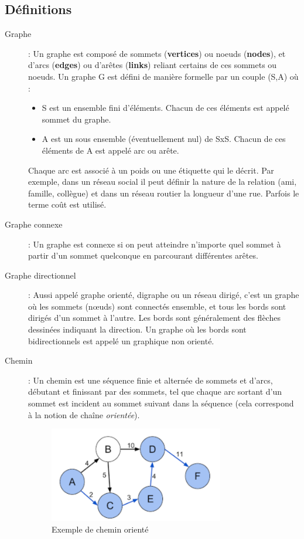 \subsection{Définitions}
\begin{description}
\item[Graphe]  : Un graphe est composé de sommets (\textbf{vertices}) ou noeuds (\textbf{nodes}), et d'arcs (\textbf{edges}) ou d'arêtes (\textbf{links}) reliant certains de ces sommets ou noeuds.
Un graphe G est défini de manière formelle par un couple (S,A) où :
\begin{itemize}
	\item S est un ensemble fini d'éléments. Chacun de ces éléments est appelé sommet du graphe.
	\item A est un sous ensemble (éventuellement nul) de SxS. Chacun de ces éléments de A est appelé arc ou arête.
\end{itemize}
Chaque arc est associé à un poids ou une étiquette qui le décrit. Par exemple, dans un réseau social il peut définir la nature de la relation (ami, famille, collègue) et dans un réseau routier la longueur d'une rue. Parfois le terme coût est utilisé.

\item[Graphe connexe] : Un graphe est connexe si on peut atteindre n'importe quel sommet à partir d'un sommet quelconque en parcourant différentes arêtes.

\item[Graphe directionnel] : Aussi appelé graphe orienté, digraphe ou un réseau dirigé, c'est un graphe où les sommets (nœuds) sont connectés ensemble, et tous les bords sont dirigés d'un sommet à l'autre. Les bords sont généralement des flèches dessinées indiquant la direction.
Un graphe où les bords sont bidirectionnels est appelé un graphique non orienté.

\item[Chemin] : Un chemin est une séquence finie et alternée de sommets et d'arcs, débutant et finissant par des sommets, tel que chaque arc sortant d'un sommet est incident au sommet suivant dans la séquence (cela correspond à la notion de chaîne \emph{orientée}).
\begin{figure}[h]
	\centering
	\includegraphics[width=0.75\textwidth]{img/cheminGraphe.png}
	\caption{Exemple de chemin orienté}
\end{figure}
\end{description}

